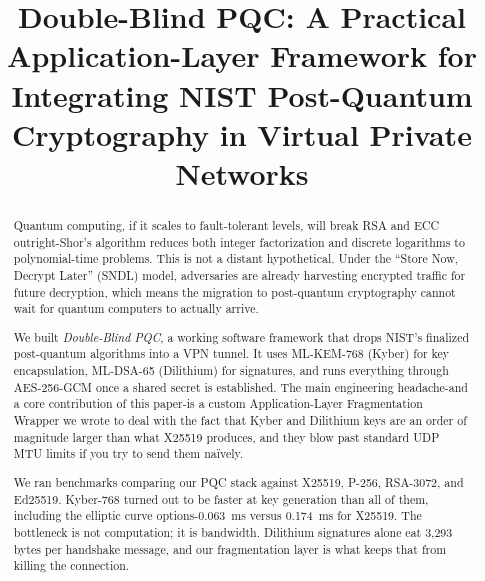\documentclass[10pt, conference, letterpaper]{IEEEtran}
\begin{document}
\title{Double-Blind PQC: A Practical Application-Layer Framework for Integrating NIST Post-Quantum Cryptography in Virtual Private Networks\\
}

\author{
\and
{}
}

\maketitle

\begin{abstract}
Quantum computing, if it scales to fault-tolerant levels, will break RSA and ECC outright-Shor's algorithm reduces both integer factorization and discrete logarithms to polynomial-time problems. This is not a distant hypothetical. Under the ``Store Now, Decrypt Later'' (SNDL) model, adversaries are already harvesting encrypted traffic for future decryption, which means the migration to post-quantum cryptography cannot wait for quantum computers to actually arrive.

We built \textit{Double-Blind PQC}, a working software framework that drops NIST's finalized post-quantum algorithms into a VPN tunnel. It uses ML-KEM-768 (Kyber) for key encapsulation, ML-DSA-65 (Dilithium) for signatures, and runs everything through AES-256-GCM once a shared secret is established. The main engineering headache-and a core contribution of this paper-is a custom Application-Layer Fragmentation Wrapper we wrote to deal with the fact that Kyber and Dilithium keys are an order of magnitude larger than what X25519 produces, and they blow past standard UDP MTU limits if you try to send them na\"ively.

We ran benchmarks comparing our PQC stack against X25519, P-256, RSA-3072, and Ed25519. Kyber-768 turned out to be faster at key generation than all of them, including the elliptic curve options-0.063~ms versus 0.174~ms for X25519. The bottleneck is not computation; it is bandwidth. Dilithium signatures alone eat 3,293 bytes per handshake message, and our fragmentation layer is what keeps that from killing the connection.
\end{abstract}
\end{document}
